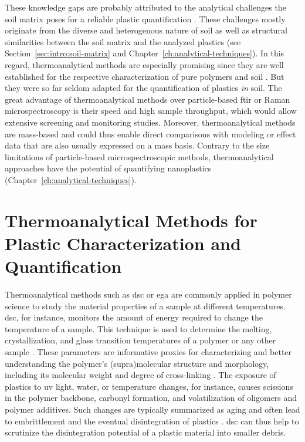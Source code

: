 These knowledge gaps are probably attributed to the analytical challenges the soil matrix poses for a reliable plastic quantification \citep{QiBehavior2020}. These challenges mostly originate from the diverse and heterogenous nature of soil as well as structural similarities between the soil matrix and the analyzed plastics (see Section~\ref{sec:intro:soil-matrix} and Chapter~\ref{ch:analytical-techniques}).
In this regard, thermoanalytical methods are especially promising since they are well established for the respective characterization of pure polymers and soil \citep{PicoPyrolysis2020}. But they were so far seldom adapted for the quantification of plastics \emph{in} soil. The great advantage of thermoanalytical methods over particle-based \ac{ftir} or Raman microspectroscopy is their speed and high sample throughput, which would allow extensive screening and monitoring studies. Moreover, thermoanalytical methods are mass-based and could thus enable direct comparisons with modeling or effect data that are also usually expressed on a mass basis. Contrary to the size limitations of particle-based microspectroscopic methods, thermoanalytical approaches have the potential of quantifying nanoplastics (Chapter~\ref{ch:analytical-techniques}).

\section{Thermoanalytical Methods for Plastic Characterization and Quantification}
\label{sec:intro:thermoanalysis}

Thermoanalytical methods such as \ac{dsc} or \ac{ega} are commonly applied in polymer science to study the material properties of a sample at different temperatures. \Ac{dsc}, for instance, monitors the amount of energy required to change the temperature of a sample. This technique is used to determine the melting, crystallization, and glass transition temperatures of a polymer or any other sample \citep{MenczelDifferential2009}. These parameters are informative proxies for characterizing and better understanding the polymer's (supra)molecular structure and morphology, including its molecular weight and degree of cross-linking \citep{BialeSystematic2021}. The exposure of plastics to \ac{uv} light, water, or temperature changes, for instance, causes scissions in the polymer backbone, carbonyl formation, and volatilization of oligomers and polymer additives. Such changes are typically summarized as aging and often lead to embrittlement and the eventual disintegration of plastics \citep{VolynskiiStructural2007,WhitePolymer2006}. \Ac{dsc} can thus help to scrutinize the disintegration potential of a plastic material into smaller debris.

